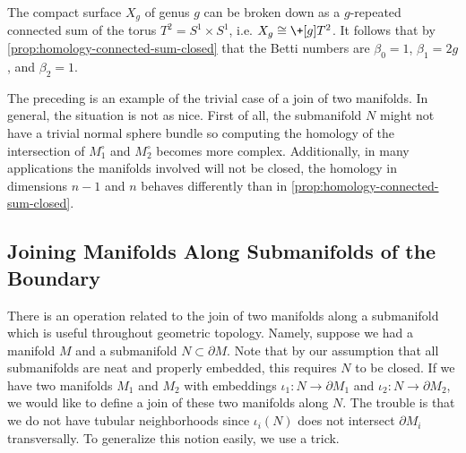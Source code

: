 \begin{example}
	The compact surface $X_g$ of genus $g$ can be broken down as a $g$-repeated connected sum of the torus $T^2=S^1\times S^1$, i.e. $X_g \cong \+[g] T^2$. It follows that by \cref{prop:homology-connected-sum-closed} that the Betti numbers are $\beta_0=1$, $\beta_1=2g$, and $\beta_2=1$.
\end{example}

The preceding is an example of the trivial case of a join of two manifolds. In general, the situation is not as nice. First of all, the submanifold $N$ might not have a trivial normal sphere bundle so computing the homology of the intersection of $M_1^\circ$ and $M_2^\circ$ becomes more complex. Additionally, in many applications the manifolds involved will not be closed, the homology in dimensions $n-1$ and $n$ behaves differently than in \cref{prop:homology-connected-sum-closed}.

\subsection{Joining Manifolds Along Submanifolds of the Boundary}\label{sec-joins-along-boundary-submanifolds}

There is an operation related to the join of two manifolds along a submanifold which is useful throughout geometric topology. Namely, suppose we had a manifold $M$ and a submanifold $N\subset \partial M$. Note that by our assumption that all submanifolds are neat and properly embedded, this requires $N$ to be closed. If we have two manifolds $M_1$ and $M_2$ with embeddings $\iota_1 : N \to \partial M_1$ and $\iota_2 : N \to \partial M_2$, we would like to define a join of these two manifolds along $N$. The trouble is that we do not have tubular neighborhoods since $\iota_i(N)$ does not intersect $\partial M_i$ transversally. To generalize this notion easily, we use a trick.

